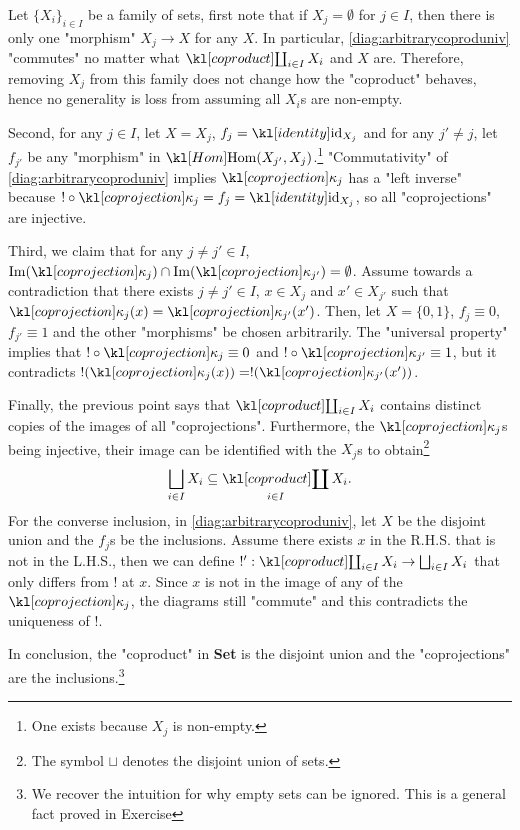 \documentclass[main.tex]{subfiles}
\begin{document}
\begin{exmp}[$\catSet$]
    Let $\{X_i\}_{i \in I}$ be a family of sets, first note that if $X_j = \emptyset$ for $j \in I$, then there is only one "morphism" $X_j \rightarrow X$ for any $X$. In particular, \eqref{diag:arbitrarycoproduniv} "commutes" no matter what $\Coproduct_{i \in I} X_i$ and $X$ are. Therefore, removing $X_j$ from this family does not change how the "coproduct" behaves, hence no generality is loss from assuming all $X_i$s are non-empty.

    Second, for any $j \in I$, let $X = X_j$, $f_j = \id_{X_j}$ and for any $j' \neq j$, let $f_{j'}$ be any "morphism" in $\Hom(X_{j'}, X_j)$.\footnote{One exists because $X_j$ is non-empty.} "Commutativity" of \eqref{diag:arbitrarycoproduniv} implies $\coprojection_j$ has a "left inverse" because $! \circ \coprojection_j = f_j = \id_{X_j}$, so all "coprojections" are injective.

    Third, we claim that for any $j \neq j' \in I$, $\im(\coprojection_j) \cap \im(\coprojection_{j'}) = \emptyset$. Assume towards a contradiction that there exists $j\neq j' \in I$, $x \in X_j$ and $x' \in X_{j'}$ such that $\coprojection_j(x) = \coprojection_{j'}(x')$. Then, let $X = \{0,1\}$, $f_j \equiv 0$, $f_{j'} \equiv 1$ and the other "morphisms" be chosen arbitrarily. The "universal property" implies that $! \circ \coprojection_j \equiv 0$ and $!\circ \coprojection_{j'} \equiv 1$, but it contradicts $!(\coprojection_j(x)) = !(\coprojection_{j'}(x'))$.

    Finally, the previous point says that $\Coproduct_{i\in I} X_i$ contains distinct copies of the images of all "coprojections". Furthermore, the $\coprojection_j$s being injective, their image can be identified with the $X_j$s to obtain\footnote{The symbol $\sqcup$ denotes the disjoint union of sets.} \[\bigsqcup_{i \in I} X_i \subseteq \Coproduct_{i \in I} X_i.\]
    For the converse inclusion, in \eqref{diag:arbitrarycoproduniv}, let $X$ be the disjoint union and the $f_j$s be the inclusions. Assume there exists $x$ in the R.H.S. that is not in the L.H.S., then we can define $!': \Coproduct_{i \in I} X_i\rightarrow \bigsqcup_{i \in I} X_i$ that only differs from $!$ at $x$. Since $x$ is not in the image of any of the $\coprojection_j$, the diagrams still "commute" and this contradicts the uniqueness of $!$.

    In conclusion, the "coproduct" in \textbf{Set} is the disjoint union and the "coprojections" are the inclusions.\footnote{We recover the intuition for why empty sets can be ignored. This is a general fact proved in Exercise }%
\end{exmp}
\end{document}
